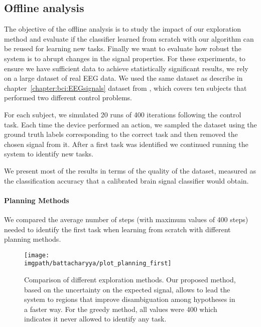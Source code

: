 
\subsection{Offline analysis}

The objective of the offline analysis is to study the impact of our exploration method and evaluate if the classifier learned from scratch with our algorithm can be reused for learning new tasks. Finally we want to evaluate how robust the system is to abrupt changes in the signal properties. For these experiments, to ensure we have sufficient data to achieve statistically significant results, we rely on a large dataset of real EEG data. We used the same dataset as describe in chapter~\ref{chapter:bci:EEGsignals} dataset from \cite{iturrate2013task}, which covers ten subjects that performed two different control problems. 

For each subject, we simulated 20 runs of 400 iterations following the control task. Each time the device performed an action, we sampled the dataset using the ground truth labels corresponding to the correct task and then removed the chosen signal from it. After a first task was identified we continued running the system to identify new tasks. 

We present most of the results in terms of the quality of the dataset, measured as the classification accuracy that a calibrated brain signal classifier would obtain.

\paragraph{Planning Methods}

We compared the average number of steps (with maximum values of 400 steps) needed to identify the first task when learning from scratch with different planning methods.

\begin{figure}[!ht]
    \centering
    \texttt{[image: \\imgpath/battacharyya/plot\_planning\_first]}
    \caption{Comparison of different exploration methods. Our proposed method, based on the uncertainty on the expected signal, allows to lead the system to regions that improve disambiguation among hypotheses in a faster way. For the greedy method, all values were 400 which indicates it never allowed to identify any task.}
    \label{fig:overlapcompplan}
\end{figure}

